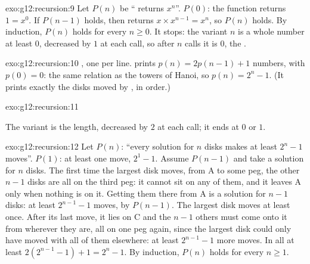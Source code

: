 \begin{solution}{exo:g12:recursion:9}
Let $P(n)$ be `` returns $x^n$''. $P(0)$: the function returns $1 = x^0$. If $P(n - 1)$ holds, then
 returns $x \times x^{n-1} = x^n$, so $P(n)$ holds. By induction, $P(n)$ holds for every $n \ge 0$.
It stops: the variant $n$ is a whole number at least $0$, decreased by $1$ at each call, so after $n$ calls it is
$0$, the .
\end{solution}

\begin{solution}{exo:g12:recursion:10}
, one per line.  prints $p(n) = 2p(n - 1) + 1$ numbers, with $p(0) = 0$: the same
relation as the towers of Hanoi, so $p(n) = 2^n - 1$. (It prints exactly the disks moved by , in order.)
\end{solution}

\begin{solution}{exo:g12:recursion:11}
\smallskip\noindent\hspace*{2em}

\noindent\hspace*{4em}

\noindent\hspace*{6em}

\noindent\hspace*{4em}

\smallskip\noindent The variant is the length, decreased by $2$ at each call; it ends at $0$ or $1$.
\end{solution}

\begin{solution}{exo:g12:recursion:12}
Let $P(n)$: ``every solution for $n$ disks makes at least $2^n - 1$ moves''. $P(1)$: at least one move, $2^1 - 1$.
Assume $P(n - 1)$ and take a solution for $n$ disks. The first time the largest disk moves, from A to some peg, the
other $n - 1$ disks are all on the third peg: it cannot sit on any of them, and it leaves A only when nothing is on
it. Getting them there from A is a solution for $n - 1$ disks: at least $2^{n-1} - 1$ moves, by $P(n - 1)$. The
largest disk moves at least once. After its last move, it lies on C and the $n - 1$ others must come onto it from
wherever they are, all on one peg again, since the largest disk could only have moved with all of them elsewhere: at
least $2^{n-1} - 1$ more moves. In all at least $2(2^{n-1} - 1) + 1 = 2^n - 1$. By induction, $P(n)$ holds for every
$n \ge 1$.
\end{solution}

